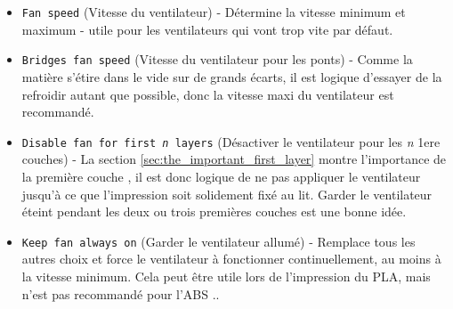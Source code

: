\begin{itemize}
	\item \texttt{Fan speed} (Vitesse du ventilateur) - D\'etermine la vitesse minimum et maximum - utile pour les ventilateurs qui vont trop vite par d\'efaut.
	\item \texttt{Bridges fan speed} (Vitesse du ventilateur pour les ponts) - Comme la mati\`ere s'\'etire dans le vide sur de grands \'ecarts, il est logique d'essayer de la refroidir autant que possible, donc la vitesse maxi du ventilateur est recommand\'e.
	\item \texttt{Disable fan for first \textit{n} layers} (D\'esactiver le ventilateur pour les \textit{n} 1ere couches) - La section \ref{sec:the_important_first_layer} montre l'importance de la premi\`ere couche , il est donc logique de ne pas appliquer le ventilateur jusqu'\`a ce que l'impression soit solidement fix\'e au lit. Garder le ventilateur \'eteint pendant les deux ou trois premi\`eres couches est une bonne id\'ee.
	\item \texttt{Keep fan always on} (Garder le ventilateur allum\'e) - Remplace tous les autres choix et force le ventilateur \`a fonctionner continuellement, au moins \`a la vitesse minimum. Cela peut \^etre utile lors de l'impression du PLA, mais n'est pas recommand\'e pour l'ABS ..
\end{itemize}

